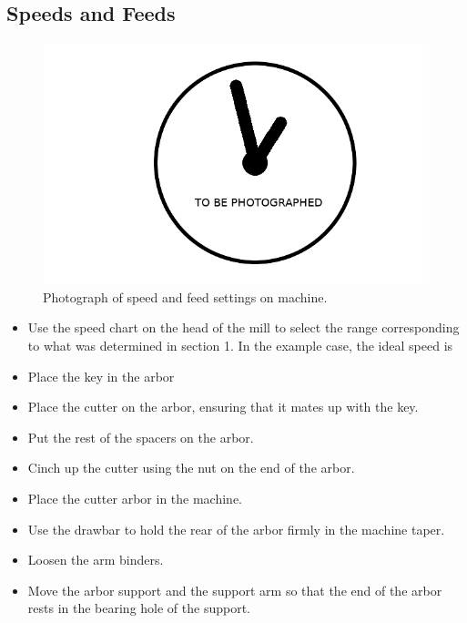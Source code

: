 \documentclass[12pt,twoside,letterpaper]{article}
\begin{document}
\subsection{Speeds and Feeds}
\begin{figure}[H]
\centering
\includegraphics[width=5in]{imgpending}
\caption{Photograph of speed and feed settings on machine.}
\end{figure}

\begin{itemize}
	\item Use the speed chart on the head of the mill to select the range corresponding to what was determined in section 1. In the example case, the ideal speed is 
	\item Place the key in the arbor
	\item Place the cutter on the arbor, ensuring that it mates up with the key.
	\item Put the rest of the spacers on the arbor.
	\item Cinch up the cutter using the nut on the end of the arbor.
	\item Place the cutter arbor in the machine.
	\item Use the drawbar to hold the rear of the arbor firmly in the machine taper.
	\item Loosen the arm binders.
	\item Move the arbor support and the support arm so that the end of the arbor rests in the bearing hole of the support.
\end{itemize}
\end{document}
